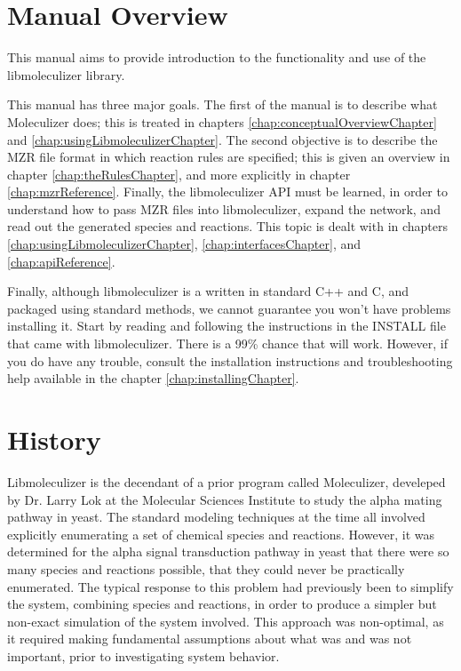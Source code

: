 \section{Manual Overview}
This manual aims to provide introduction to the functionality and use
of the libmoleculizer library.  

This manual has three major goals.  The first of the manual is to
describe what Moleculizer does; this is treated in chapters
\ref{chap:conceptualOverviewChapter} and
\ref{chap:usingLibmoleculizerChapter}.  The second objective is to
describe the MZR file format in which reaction rules are specified;
this is given an overview in chapter \ref{chap:theRulesChapter}, and
more explicitly in chapter \ref{chap:mzrReference}.  Finally, the
libmoleculizer API must be learned, in order to understand how to pass
MZR files into libmoleculizer, expand the network, and read out
the generated species and reactions.  This topic is dealt with in
chapters \ref{chap:usingLibmoleculizerChapter},
\ref{chap:interfacesChapter}, and \ref{chap:apiReference}.

Finally, although libmoleculizer is a written in standard C++ and C,
and packaged using standard methods, we cannot guarantee you won't
have problems installing it.  Start by reading and following the
instructions in the INSTALL file that came with libmoleculizer.  There
is a 99\% chance that will work.  However, if you do have any trouble,
consult the installation instructions and troubleshooting help
available in the chapter \ref{chap:installingChapter}.

\section{History}

Libmoleculizer is the decendant of a prior program called Moleculizer,
develeped by Dr. Larry Lok at the Molecular Sciences Institute to
study the alpha mating pathway in yeast. The standard modeling
techniques at the time all involved explicitly enumerating a set of
chemical species and reactions. However, it was determined for the
alpha signal transduction pathway in yeast that there were so many
species and reactions possible, that they could never be practically
enumerated. The typical response to this problem had previously been
to simplify the system, combining species and reactions, in order to
produce a simpler but non-exact simulation of the system
involved. This approach was non-optimal, as it required making
fundamental assumptions about what was and was not important, prior to
investigating system behavior.

